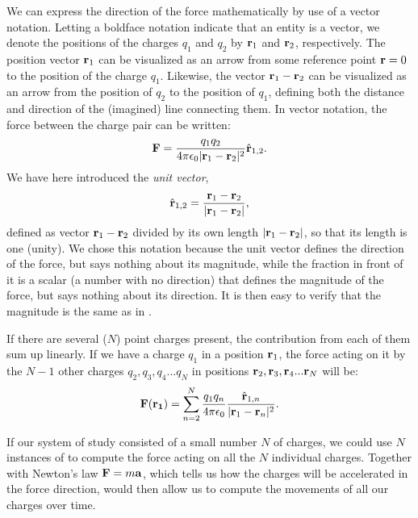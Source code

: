We can express the direction of the force mathematically by use of a vector notation. Letting a boldface notation indicate that an entity is a vector, we denote the positions of the charges $q_1$ and $q_2$ by ${\bf r}_1$ and ${\bf r}_2$, respectively. The position vector ${\bf r}_1$ can be visualized as an arrow from some reference point ${\bf r} =0$ to the position of the charge $q_1$. Likewise, the vector ${\bf r}_1-{\bf r}_2$ can be visualized as an arrow from the position of $q_2$ to the position of $q_1$, defining both the distance and direction of the (imagined) line connecting them. In vector notation, the force between the charge pair can be written:
\begin{equation}
{\bf F} = \frac{q_1q_2}{4\pi \epsilon_0 |{\bf r}_1-{\bf r}_2|^2} \hat{{\bf r}}_{1,2}.
\label{eq:Basics:CoulombFvec}
\end{equation}
We have here introduced the \textit{unit vector},
\begin{equation}
\hat{{\bf r}}_{1,2} = \frac{{\bf r}_1 - {\bf r}_2}{|{\bf r}_1-{\bf r}_2|},
\label{eq:Basics:UnitVector}
\end{equation}
defined as vector ${\bf r}_1-{\bf r}_2$ divided by its own length $|{\bf r}_1-{\bf r}_2|$, so that its length is one (unity). We chose this notation because the unit vector defines the direction of the force, but says nothing about its magnitude, while the fraction in front of it is a scalar (a number with no direction) that defines the magnitude of the force, but  says nothing about its direction. It is then easy to verify that the magnitude is the same as in .

If there are several ($N$) point charges present, the contribution from each of them sum up linearly. If we have a charge $q_1$ in a position ${\bf r}_1$, the force acting on it by the $N-1$ other charges $q_2, q_3, q_4 ... q_{N}$ in positions ${\bf r}_2, {\bf r}_3, {\bf r}_4 ... {\bf r}_{N}$ will be:
\begin{equation}
{\bf F}({\bf r_1}) = \sum_{n=2}^{N} \frac{q_1 q_n}{4\pi \epsilon_0} \frac{\hat{{\bf r}}_{1,n}}{|{\bf r}_1-{\bf r}_n|^2}.
\label{eq:Basics:CoulombFN}
\end{equation}

If our system of study consisted of a small number $N$ of charges, we could use $N$ instances of  to compute the force acting on all the $N$ individual charges. Together with Newton's law ${\bf F} = m {\bf a}$, which tells us how the charges will be accelerated in the force direction,  would then allow us to compute the movements of all our charges over time.


